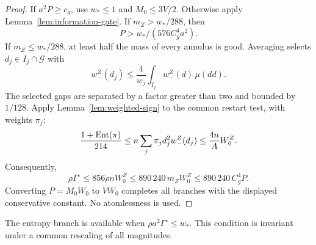 \begin{proof}
If \(a^2P\ge c_g\), use \(w_*\le1\) and \(M_0\le3V/2\).
Otherwise apply Lemma~\ref{lem:information-gate}.
If \(m_Z>w_*/288\), then
\[
 P>w_*/(576C_g^4a^2).
\]
If \(m_Z\le w_*/288\), at least half the mass of every annulus is
good.  Averaging selects \(d_j\in I_j\cap\mathcal G\) with
\[
 w_-^Z(d_j)\le\frac4{w_j}\int_{I_j}w_-^Z(d)\,\mu(dd).
\]
The selected gaps are separated by a factor greater than two and
bounded by \(1/128\).
Apply Lemma~\ref{lem:weighted-sign} to the common restart test,
with weights \(\pi_j\):
\[
 \frac{1+\operatorname{Ent}(\pi)}{214}
 \le n\sum_j\pi_jd_j^2w_-^Z(d_j)
 \le\frac{4n}{A}W_0^Z.
\]
Consequently,
\[
 \rho\Gamma^{\circ}
 \le856\rho nW_0^Z
 \le890\,240\,m_ZW_0^Z
 \le890\,240\,C_g^4P.
\]
Converting \(P=M_0W_0\) to \(VW_0\) completes all branches with the
displayed conservative constant.  No atomlessness is used.
\end{proof}

The entropy branch is available when $\rho a^2\Gamma^{\circ}\le w_*$.
This condition is invariant under a common rescaling of all magnitudes.
